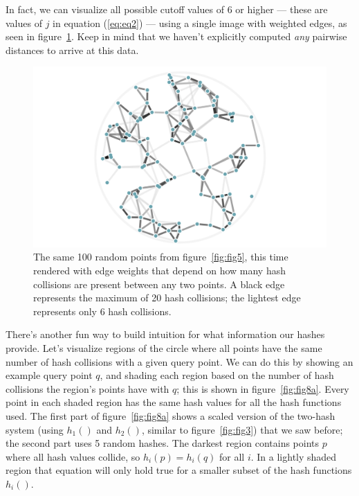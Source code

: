 \documentclass[20pt,]{extarticle}
\begin{document}
In fact, we can visualize all possible cutoff values of 6 or higher ---
these are values of \(j\) in equation (\ref{eq:eq2}) --- using a single
image with weighted edges, as seen in figure~\ref{fig:fig6}. Keep in
mind that we haven't explicitly computed \emph{any} pairwise distances
to arrive at this data.

\begin{figure}
\centering
\includegraphics{images/lsh_image6.png}
\caption{The same 100 random points from figure~\ref{fig:fig5}, this
time rendered with edge weights that depend on how many hash collisions
are present between any two points. A black edge represents the maximum
of 20 hash collisions; the lightest edge represents only 6 hash
collisions.}\label{fig:fig6}
\end{figure}

There's another fun way to build intuition for what information our
hashes provide. Let's visualize regions of the circle where all points
have the same number of hash collisions with a given query point. We can
do this by showing an example query point \(q\), and shading each region
based on the number of hash collisions the region's points have with
\(q\); this is shown in figure~\ref{fig:fig8a}. Every point in each
shaded region has the same hash values for all the hash functions used.
The first part of figure~\ref{fig:fig8a} shows a scaled version of the
two-hash system (using \(h_1()\) and \(h_2()\), similar to
figure~\ref{fig:fig3}) that we saw before; the second part uses 5 random
hashes. The darkest region contains points \(p\) where all hash values
collide, so \(h_i(p) = h_i(q)\) for all \(i\). In a lightly shaded
region that equation will only hold true for a smaller subset of the
hash functions \(h_i().\)
\end{document}
